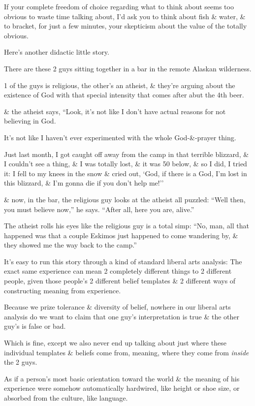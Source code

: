 \documentclass{article}
\begin{document}
If your complete freedom of choice regarding what to think about seems too obvious to waste time talking about, I'd ask you to think about fish \& water, \& to bracket, for just a few minutes, your skepticism about the value of the totally obvious.

Here's another didactic little story.

There are these 2 guys sitting together in a bar in the remote Alaskan wilderness.

1 of the guys is religious, the other's an atheist, \& they're arguing about the existence of God with that special intensity that comes after abut the 4th beer.

\& the atheist says, ``Look, it's not like I don't have actual reasons for not believing in God.

It's not like I haven't ever experimented with the whole God-\&-prayer thing.

Just last month, I got caught off away from the camp in that terrible blizzard, \& I couldn't see a thing, \& I was totally lost, \& it was 50 below, \& so I did, I tried it: I fell to my knees in the snow \& cried out, `God, if there is a God, I'm lost in this blizzard, \& I'm gonna die if you don't help me!''

\& now, in the bar, the religious guy looks at the atheist all puzzled: ``Well then, you must believe now,'' he says. ``After all, here you are, alive.''

The atheist rolls his eyes like the religious guy is a total simp: ``No, man, all that happened was that a couple Eskimos just happened to come wandering by, \& they showed me the way back to the camp.''

It's easy to run this story through a kind of standard liberal arts analysis: The exact same experience can mean 2 completely different things to 2 different people, given those people's 2 different belief templates \& 2 different ways of constructing meaning from experience.

Because we prize tolerance \& diversity of belief, nowhere in our liberal arts analysis do we want to claim that one guy's interpretation is true \& the other guy's is false or bad.

Which is fine, except we also never end up talking about just where these individual templates \& beliefs come from, meaning, where they come from {\it inside} the 2 guys.

As if a person's most basic orientation toward the world \& the meaning of his experience were somehow automatically hardwired, like height or shoe size, or absorbed from the culture, like language.
\end{document}
